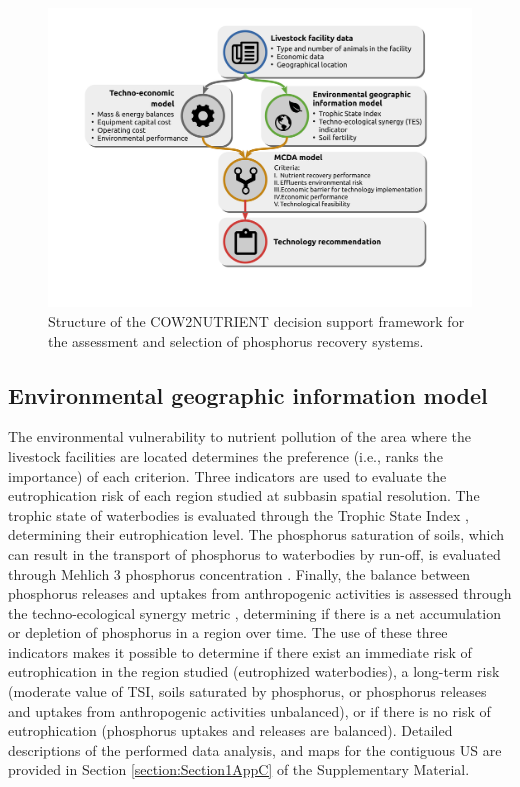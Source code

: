 \begin{refsection}[referencesCh4]
\begin{figure}[h]
	\centering
	\includegraphics[width=0.95\linewidth, trim={3cm 4cm 4cm 1.5cm},clip]{gfx/Chapter4/tool_diagram_v4color.pdf} 
	\caption{Structure of the COW2NUTRIENT decision support framework for the assessment and selection of phosphorus recovery systems.}
	\label{fig:tool_diagramPaperTool}
\end{figure}

\subsection{Environmental geographic information model}
The environmental vulnerability to nutrient pollution of the area where the livestock facilities are located determines the preference (i.e., ranks the importance) of each criterion. 
Three indicators are used to evaluate the eutrophication risk of each region studied at subbasin spatial resolution. The trophic state of waterbodies is evaluated through the Trophic State Index \citep{carlson_trophic_1977}, determining their eutrophication level. The phosphorus saturation of soils, which can result in the transport of phosphorus to waterbodies by run-off, is evaluated through Mehlich 3 phosphorus concentration \citep{Espinoza2006}. Finally, the balance between phosphorus releases and uptakes from  anthropogenic activities is assessed through the techno-ecological synergy metric \citep{TESmetric}, determining if there is a net accumulation or depletion of phosphorus in a region over time. The use of these three indicators makes it possible to determine if there exist an immediate risk of eutrophication in the region studied (eutrophized waterbodies), a long-term risk (moderate value of TSI, soils saturated by phosphorus, or phosphorus releases and uptakes from  anthropogenic activities unbalanced), or if there is no risk of eutrophication (phosphorus uptakes and releases are balanced). Detailed descriptions of the performed data analysis, and maps for the contiguous US are provided in Section \ref{section:Section1AppC} of the Supplementary Material.


\end{refsection}
